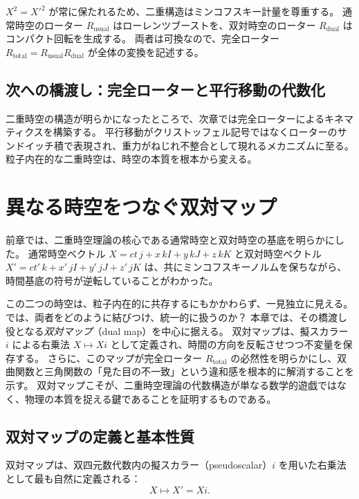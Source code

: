 \documentclass[dvipdfmx,a4paper]{jsbook}
\theoremstyle{definition}
\theoremstyle{remark}
\begin{document}
$X^2 = X'^2$ が常に保たれるため、二重構造はミンコフスキー計量を尊重する。
通常時空のローター $R_{\text{usual}}$ はローレンツブーストを、双対時空のローター $R_{\text{dual}}$ はコンパクト回転を生成する。
両者は可換なので、完全ローター $R_{\text{total}} = R_{\text{usual}} R_{\text{dual}}$ が全体の変換を記述する。

\section{次への橋渡し：完全ローターと平行移動の代数化}
\label{sec:to-kinematics}

二重時空の構造が明らかになったところで、次章では完全ローターによるキネマティクスを構築する。
平行移動がクリストッフェル記号ではなくローターのサンドイッチ積で表現され、重力がねじれ不整合として現れるメカニズムに至る。
粒子内在的な二重時空は、時空の本質を根本から変える。

\chapter{異なる時空をつなぐ双対マップ}
\label{chap:dual-map}

前章では、二重時空理論の核心である通常時空と双対時空の基底を明らかにした。  
通常時空ベクトル $X = ct \, j + x \, kI + y \, kJ + z \, kK$ と双対時空ベクトル $X' = ct' \, k + x' \, jI + y' \, jJ + z' \, jK$ は、共にミンコフスキーノルムを保ちながら、時間基底の符号が逆転していることがわかった。  

この二つの時空は、粒子内在的に共存するにもかかわらず、一見独立に見える。  
では、両者をどのように結びつけ、統一的に扱うのか？  
本章では、その橋渡し役となる\emph{双対マップ}（dual map）を中心に据える。  
双対マップは、擬スカラー $i$ による右乗法 $X \mapsto Xi$ として定義され、時間の方向を反転させつつ不変量を保存する。  
さらに、このマップが完全ローター $R_\text{total}$ の必然性を明らかにし、双曲関数と三角関数の「見た目の不一致」という違和感を根本的に解消することを示す。  
双対マップこそが、二重時空理論の代数構造が単なる数学的遊戯ではなく、物理の本質を捉える鍵であることを証明するものである。

\section{双対マップの定義と基本性質}
\label{sec:dual-map-definition}

双対マップは、双四元数代数内の擬スカラー（pseudoscalar）$i$ を用いた右乗法として最も自然に定義される：
\begin{equation}
  X \mapsto X' = X i.
  \label{eq:dual-map}
\end{equation}
\end{document}
